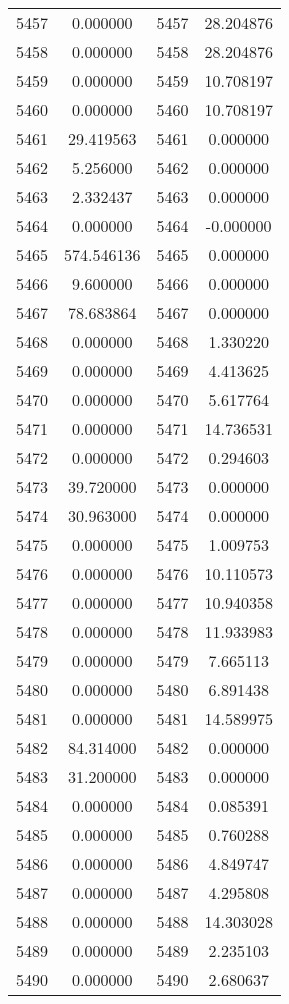 \documentclass[12pt]{article}
\begin{document}
\begin{longtable}{@{}cccc@{}}
5457 & 0.000000 & 5457 & 28.204876 \\
5458 & 0.000000 & 5458 & 28.204876 \\
5459 & 0.000000 & 5459 & 10.708197 \\
5460 & 0.000000 & 5460 & 10.708197 \\
5461 & 29.419563 & 5461 & 0.000000 \\
5462 & 5.256000 & 5462 & 0.000000 \\
5463 & 2.332437 & 5463 & 0.000000 \\
5464 & 0.000000 & 5464 & -0.000000 \\
5465 & 574.546136 & 5465 & 0.000000 \\
5466 & 9.600000 & 5466 & 0.000000 \\
5467 & 78.683864 & 5467 & 0.000000 \\
5468 & 0.000000 & 5468 & 1.330220 \\
5469 & 0.000000 & 5469 & 4.413625 \\
5470 & 0.000000 & 5470 & 5.617764 \\
5471 & 0.000000 & 5471 & 14.736531 \\
5472 & 0.000000 & 5472 & 0.294603 \\
5473 & 39.720000 & 5473 & 0.000000 \\
5474 & 30.963000 & 5474 & 0.000000 \\
5475 & 0.000000 & 5475 & 1.009753 \\
5476 & 0.000000 & 5476 & 10.110573 \\
5477 & 0.000000 & 5477 & 10.940358 \\
5478 & 0.000000 & 5478 & 11.933983 \\
5479 & 0.000000 & 5479 & 7.665113 \\
5480 & 0.000000 & 5480 & 6.891438 \\
5481 & 0.000000 & 5481 & 14.589975 \\
5482 & 84.314000 & 5482 & 0.000000 \\
5483 & 31.200000 & 5483 & 0.000000 \\
5484 & 0.000000 & 5484 & 0.085391 \\
5485 & 0.000000 & 5485 & 0.760288 \\
5486 & 0.000000 & 5486 & 4.849747 \\
5487 & 0.000000 & 5487 & 4.295808 \\
5488 & 0.000000 & 5488 & 14.303028 \\
5489 & 0.000000 & 5489 & 2.235103 \\
5490 & 0.000000 & 5490 & 2.680637 \\

\end{longtable}
\end{document}
